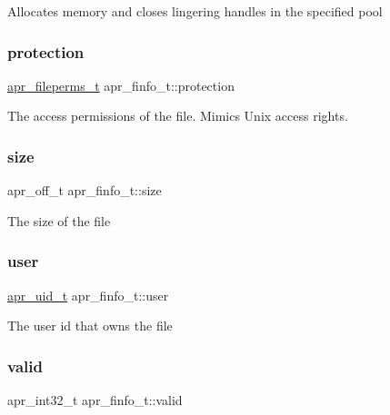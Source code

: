 Allocates memory and closes lingering handles in the specified pool \mbox{\label{structapr__finfo__t_a7c09d73ad1957e2c0e6c6b77d94e90ab}} 
\subsubsection{\texorpdfstring{protection}{protection}}
{\footnotesize\ttfamily \mbox{\hyperlink{group__apr__file__info_ga3af19c4c47007169064a70f9351bc7d8}{apr\+\_\+fileperms\+\_\+t}} apr\+\_\+finfo\+\_\+t\+::protection}

The access permissions of the file. Mimics Unix access rights. \mbox{\label{structapr__finfo__t_a3e47a673c5b82a25a783a732dee6f946}} 
\subsubsection{\texorpdfstring{size}{size}}
{\footnotesize\ttfamily apr\+\_\+off\+\_\+t apr\+\_\+finfo\+\_\+t\+::size}

The size of the file \mbox{\label{structapr__finfo__t_ab79d14bd50f50662d29ad433166c4bc5}} 
\subsubsection{\texorpdfstring{user}{user}}
{\footnotesize\ttfamily \mbox{\hyperlink{group__apr__user_gad1aa508f584bc230acf4f68ba4fc4de7}{apr\+\_\+uid\+\_\+t}} apr\+\_\+finfo\+\_\+t\+::user}

The user id that owns the file \mbox{\label{structapr__finfo__t_aff0cdf06637edec63c4701e582792019}} 
\subsubsection{\texorpdfstring{valid}{valid}}
{\footnotesize\ttfamily apr\+\_\+int32\+\_\+t apr\+\_\+finfo\+\_\+t\+::valid}

